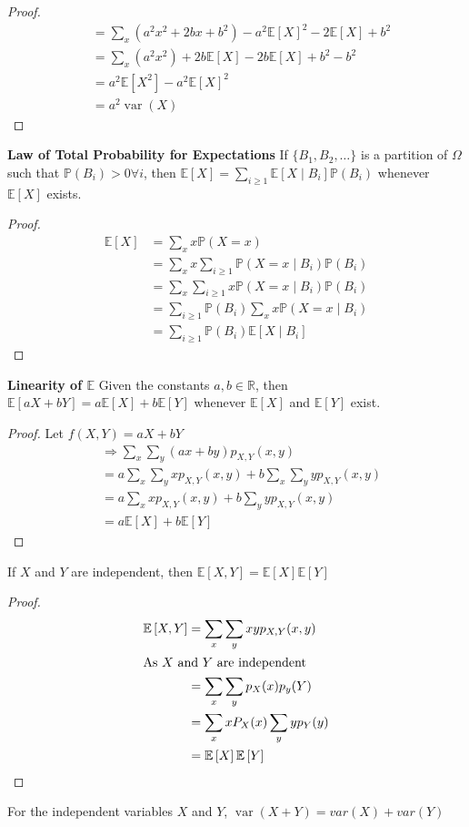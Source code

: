 \documentclass[fontsize=10pt]{article}
\numberwithin{equation}{subsection}
\newcommand{\PP}[1]{\mathbb{P}\left(#1\right)}
\newcommand{\EE}[1]{\mathbb{E}\left[#1\right]}
\newcommand{\setreal}{\mathbb{R}}
\newcommand{\var}{\mathop{\mathrm{var}}}
\begin{document}
\begin{itemize*}
\begin{multicols}{2}
\begin{proof}
\begin{align*}
&=\sum_x\left(a^2x^2 + 2bx +b^2\right)-a^2\EE X^2-2\EE X+b^2\\
&=\sum_x\left(a^2x^2\right)+2b\EE X-2b\EE X+b^2-b^2\\
&=a^2\EE{X^2}-a^2\EE X^2\\
&=a^2\var(X)
\end{align*}
\end{proof}
\item{\bf Law of Total Probability for Expectations}  If $\{B_1,B_2,\ldots\}$ is a partition of $\Omega$ such that $\PP{B_i}>0\forall i$, then $\EE X=\sum_{i\ge1}\EE{X\mid B_i}\PP{B_i}$ whenever $\EE X$ exists.
\begin{proof}
\begin{align*}
\EE X &=\sum_xx\PP{X=x}\\
&=\sum_xx\sum_{i\ge1}\PP{X=x\mid B_i}\PP{B_i}\\
&=\sum_x\sum_{i\ge1}x\PP{X=x\mid B_i}\PP{B_i}\\
&=\sum_{i\ge1}\PP{B_i}\sum_xx\PP{X=x\mid B_i}\\
&=\sum_{i\ge1}\PP{B_i}\EE{X\mid B_i}
\end{align*}
\end{proof}
\item{\bf Linearity of $\mathbb{E}$}  Given the constants $a,b\in\setreal$, then $\EE{aX+bY}=a\EE X+b\EE Y$ whenever $\EE X$ and $\EE Y$ exist.
\begin{proof}
Let $f(X,Y)=aX+bY$
\begin{align*}
&\Rightarrow\sum_x\sum_y(ax+by)p_{X,Y}(x,y)\\
&=a\sum_x\sum_yxp_{X,Y}(x,y)+b\sum_x\sum_yyp_{X,Y}(x,y)\\
&=a\sum_xxp_{X,Y}(x,y)+b\sum_yyp_{X,Y}(x,y)\\
&=a\EE X+b\EE Y
\end{align*}
\end{proof}
\item If $X$ and $Y$ are independent, then $\EE{X,Y}=\EE X\EE Y$
\begin{proof}
\begin{align*}
\EE{X,Y}&=\sum_x\sum_yxyp_{X,Y}(x,y)\\
\intertext{As $X$ and $Y$ are independent}&=\sum_x\sum_yp_X(x)p_y(Y)\\
&=\sum_xxP_X(x)\sum_yyp_Y(y)\\
&=\EE X\EE Y
\end{align*}
\end{proof}
\end{multicols}
\item For the independent variables $X$ and $Y$, $\var(X+Y)=var(X)+var(Y)$

\end{itemize*}
\end{document}
